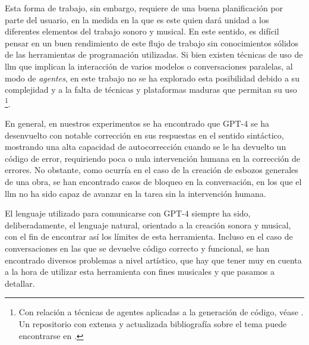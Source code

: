 Esta forma de trabajo, sin embargo, requiere de una buena planificación por parte del usuario, en la medida en la que es este quien dará unidad a los diferentes elementos del trabajo sonoro y musical. En este sentido, es difícil pensar en un buen rendimiento de este flujo de trabajo sin conocimientos sólidos de las herramientas de programación utilizadas. Si bien existen técnicas de uso de \gls{llm} que implican la interacción de varios modelos o conversaciones paralelas, al modo de \emph{agentes}, en este trabajo no se ha explorado esta posibilidad debido a su complejidad y a la falta de técnicas y plataformas maduras que permitan su uso \footnote{Con relación a técnicas de agentes aplicadas a la generación de código, véase \cite{huangAgentCoderMultiAgentbasedCode2023}. Un repositorio con extensa y actualizada bibliografía sobre el tema puede encontrarse en \cite{AGIEdgerunnersLLMAgentsPapers2024}.}.

En general, en nuestros experimentos se ha encontrado que GPT-4 se ha desenvuelto con notable corrección en sus respuestas en el sentido sintáctico, mostrando una alta capacidad de autocorrección cuando se le ha devuelto un código de error, requiriendo poca o nula intervención humana en la corrección de errores. No obstante, como ocurría en el caso de la creación de esbozos generales de una obra, se han encontrado casos de bloqueo en la conversación, en los que el \gls{llm} no ha sido capaz de avanzar en la tarea sin la intervención humana. 

El lenguaje utilizado para comunicarse con GPT-4 siempre ha sido, deliberadamente, el lenguaje natural, orientado a la creación sonora y musical, con el fin de encontrar así los límites de esta herramienta. Incluso en el caso de conversaciones en las que se devuelve código correcto y funcional, se han encontrado diversos problemas a nivel artístico, que hay que tener muy en cuenta a la hora de utilizar esta herramienta con fines musicales y que pasamos a detallar.


